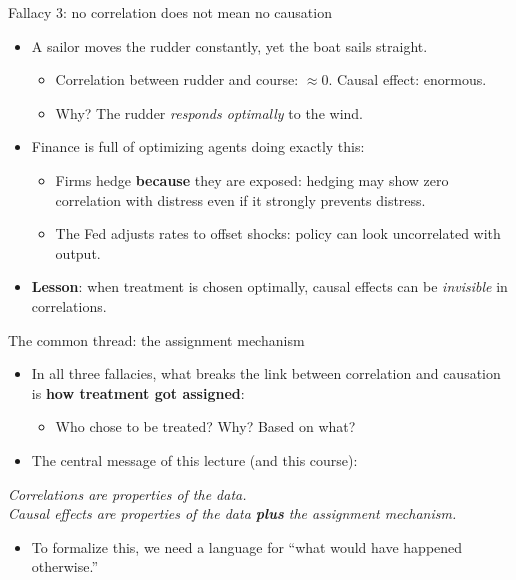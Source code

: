 \documentclass[
  11pt,
  ignorenonframetext,
  aspectratio=169,
]{beamer}
\providecommand{\tightlist}{%
  \setlength{\itemsep}{0pt}\setlength{\parskip}{0pt}}
\begin{document}
\begin{frame}{Fallacy 3: no correlation does not mean no causation}
\protect{}\label{fallacy-3-no-correlation-does-not-mean-no-causation}
\begin{itemize}
\tightlist
\item
  A sailor moves the rudder constantly, yet the boat sails straight.

  \begin{itemize}
  \tightlist
  \item
    Correlation between rudder and course: \(\approx 0\). Causal effect:
    enormous.
  \item
    Why? The rudder \emph{responds optimally} to the wind.
  \end{itemize}
\item
  Finance is full of optimizing agents doing exactly this:

  \begin{itemize}
  \tightlist
  \item
    Firms hedge \textbf{because} they are exposed: hedging may show zero
    correlation with distress even if it strongly prevents distress.
  \item
    The Fed adjusts rates to offset shocks: policy can look uncorrelated
    with output.
  \end{itemize}
\item
  \textbf{Lesson}: when treatment is chosen optimally, causal effects
  can be \emph{invisible} in correlations.
\end{itemize}
\end{frame}

\begin{frame}{The common thread: the assignment mechanism}
\protect{}\label{the-common-thread-the-assignment-mechanism}
\begin{itemize}
\tightlist
\item
  In all three fallacies, what breaks the link between correlation and
  causation is \textbf{how treatment got assigned}:

  \begin{itemize}
  \tightlist
  \item
    Who chose to be treated? Why? Based on what?
  \end{itemize}
\item
  The central message of this lecture (and this course):
\end{itemize}

\begin{center}
\emph{Correlations are properties of the data.\\
Causal effects are properties of the data \textbf{plus} the assignment mechanism.}
\end{center}

\begin{itemize}
\tightlist
\item
  To formalize this, we need a language for ``what would have happened
  otherwise.''
\end{itemize}
\end{frame}
\end{document}

